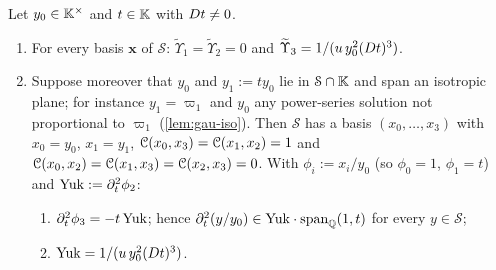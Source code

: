 \begin{lem}
\label{lem:gau-sg}
Let $y_0\in\mathbb{K}^\times$ and $t\in\mathbb{K}$ with $D t\neq0$.
\begin{enumerate}
\item[(a)] For every basis $\mathbf x$ of $\mathcal S$: $\widetilde\Upsilon_1=\widetilde\Upsilon_2=0$ and $\widetilde\Upsilon_3=1/(u\,y_0^2(D t)^3)$.
\item[(b)] Suppose moreover that $y_0$ and $y_1:=ty_0$ lie in $\mathcal S\cap\mathbb{K}$ and span an isotropic plane; for instance $y_1=\varpi_1$ and $y_0$ any power-series solution not proportional to $\varpi_1$ (\cref{lem:gau-iso}). Then $\mathcal S$ has a basis $(x_0,\dots,x_3)$ with $x_0=y_0$, $x_1=y_1$, $\mathcal{C}(x_0,x_3)=\mathcal{C}(x_1,x_2)=1$ and $\mathcal{C}(x_0,x_2)=\mathcal{C}(x_1,x_3)=\mathcal{C}(x_2,x_3)=0$. With $\phi_i:=x_i/y_0$ (so $\phi_0=1$, $\phi_1=t$) and $\mathrm{Yuk}:=\partial_t^2\phi_2$:
\begin{enumerate}
\item $\partial_t^2\phi_3=-t\,\mathrm{Yuk}$; hence $\partial_t^2(y/y_0)\in\mathrm{Yuk}\cdot\operatorname{span}_{\mathbb{Q}}(1,t)$ for every $y\in\mathcal S$;
\item $\mathrm{Yuk}=1/(u\,y_0^2(D t)^3)$.
\end{enumerate}
\end{enumerate}
\end{lem}

